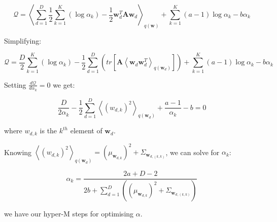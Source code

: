 \documentclass[12pt]{article}
\begin{document}
\[\mathcal{Q} =  \left\langle \sum_{d=1}^D \frac{1}{2}  \sum_{k=1}^K \left(\log\alpha_k \right)  -\frac{1}{2}\textbf{w}_{d}^T \textbf{A}\textbf{w}_{d} \right\rangle_{q(\textbf{w})} + \sum_{k=1}^K (a-1)\log\alpha_k -b\alpha_k\]

Simplifying:

\[\mathcal{Q} =  \frac{D}{2}  \sum_{k=1}^K \left( \log\alpha_k \right)  - \frac{1}{2}\sum_{d=1}^D \left( tr \left[ \textbf{A}\left\langle  \textbf{w}_{d}\textbf{w}_{d}^T \right\rangle_{q(\textbf{w}_d)} \right]\right)+ \sum_{k=1}^K (a-1)\log\alpha_k -b\alpha_k\]

%


Setting $\frac{d\mathcal{Q}}{d\alpha_k} = 0$ we get:

\[ \frac{D}{2\alpha_k} -\frac{1}{2} \sum_{d=1}^D\left\langle (w_{d, k})^2 \right\rangle_{q(\textbf{w}_{d})} + \frac{a-1}{\alpha_k} - b = 0\]

where $w_{d, k}$ is the $k^{th}$ element of $\textbf{w}_d$.

Knowing $\left\langle (w_{d, k})^2 \right\rangle_{q(\textbf{w}_{d})} = (\mu_{\textbf{w}_{d, k}})^2 + \Sigma_{\textbf{w}_{d, (k, k)}}$, we can solve for $\alpha_k$:

\[ \alpha_k = \frac{2a+D-2}{2b+ \sum_{d=1}^D \left((\mu_{\textbf{w}_{d, k}})^2 + \Sigma_{\textbf{w}_{d, (k, k)}}\right) }\]

we have our hyper-M steps for optimising $\alpha$.
\end{document}
